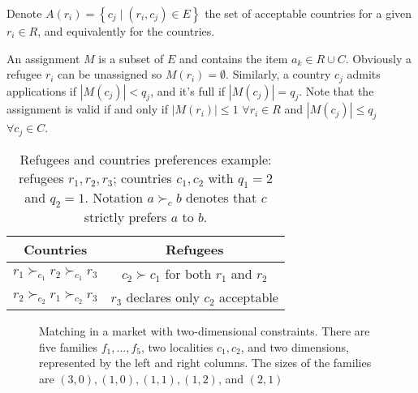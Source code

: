 \documentclass[letterpaper]{article} %
\begin{document}
    Denote $A \left( r_i \right) = \left\{ c_j \mid \left( r_i, c_j \right) \in E \right\}$ the set of acceptable countries for a given $r_i \in R$, and equivalently for the countries.
    
    An assignment $M$ is a subset of $E$ and contains the item $a_k \in R \cup C$.
    Obviously a refugee $r_i$ can be unassigned so $M \left( r_i \right) = \emptyset$.
    Similarly, a country $c_j$ admits applications if $\left| M \left( c_j \right) \right| < q_j$, and it's full if $\left| M \left( c_j \right) \right| = q_j$.
    Note that the assignment is valid if and only if $\left| M \left( r_i \right) \right| \leq 1$ $\forall r_i \in R$ and $\left| M \left( c_j \right) \right| \leq q_j$ $\forall c_j \in C$.

    \begin{table}[!htb]
        \begin{tabular}{c|c}
            \hline Countries & Refugees \\
            \hline $r_1 \succ_{c_1} r_2 \succ_{c_1} r_3$ & $c_2 \succ c_1$ for both $r_1$ and $r_2$ \\
            $r_2 \succ_{c_2} r_1 \succ_{c_2} r_3$ & $r_3$ declares only $c_2$ acceptable \\
            \hline
        \end{tabular}
        \caption{Refugees and countries preferences example: refugees $r_1, r_2, r_3$; countries $c_1, c_2$ with $q_1 = 2$ and $q_2 = 1$. Notation $a \succ_c b$ denotes that $c$ strictly prefers $a$ to $b$.}
        \label{tab:countries-refugees}
    \end{table}

    \begin{figure}[!htb] %
        \def\svgwidth{\columnwidth}
        
        \caption{Matching in a market with two-dimensional constraints. There are five families
        \(f_1, \dots, f_5\), two localities \(c_1, c_2\), and two dimensions, represented by the left and right columns.
        The sizes of the families are \((3, 0), (1, 0), (1, 1), (1, 2)\), and \((2, 1)\)}
        \label{fig:complete_matching}
    \end{figure}
\end{document}
